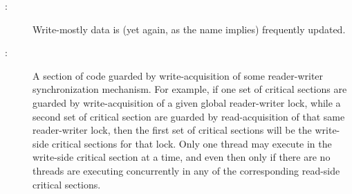 \begin{description}
\item[:]
	Write-mostly data is (yet again, as the name implies) frequently
	updated.
\item[:]
	A section of code guarded by write-acquisition of
	some reader-writer synchronization mechanism.
	For example, if one set of critical sections are guarded by
	write-acquisition of
	a given global reader-writer lock, while a second set of critical
	section are guarded by read-acquisition of that same reader-writer
	lock, then the first set of critical sections will be the
	write-side critical sections for that lock.
	Only one thread may execute in the write-side critical section
	at a time, and even then only if there are no threads are
	executing concurrently in any of the corresponding read-side
	critical sections.
\end{description}

